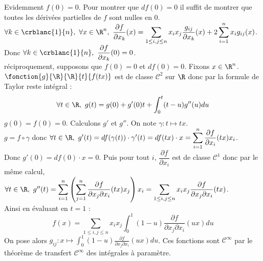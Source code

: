 \documentclass{book}
\begin{document}
\begin{enumerate}
		Evidemment $f(0)=0$. Pour montrer que $df(0)=0$ il suffit de montrer que toutes les dérivées partielles de $f$ sont nulles en $0$.\\
		$\forall k\in \crblanc{1}{n},\ \forall x\in \R^n,\ \dfrac{\partial f}{\partial x_k}(x)=\displaystyle\sum_{1\leq i,j\leq n}x_ix_j\frac{g_{ij}}{\partial x_k}(x)+2\sum_{i=1}^nx_ig_{ij}(x)$. Donc $\forall k\in \crblanc{1}{n},\ \dfrac{\partial f}{\partial x_k}(0)=0$.\\
		réciproquement, supposons que $f(0)=0$ et $df(0)=0$. Fixons $x\in \R^n$.\\
		$\fonction{g}{\R}{\R}{t}{f(tx)}$ est de classe $\mathcal C^2$ sur $\R$ donc par la formule de Taylor reste intégral :
		$$\forall t\in \R,\ g(t)=g(0)+g'(0)t+\int_0^t(t-u)g''(u)du$$
		$g(0)=f(0)=0$. Calculons $g'$ et $g''$. On note $\gamma:t\mapsto tx$.\\
		$g=f\circ \gamma$ donc $\forall t\in \R,\ g'(t)=df(\gamma(t))\cdot\gamma'(t)=df(tx)\cdot x=\displaystyle\sum_{i=1}^n\frac{\partial f}{\partial x_i}(tx)x_i$.\\
		Donc $g'(0)=df(0)\cdot x=0$. Puis pour tout $i$, $\dfrac{\partial f}{\partial x_i}$ est de classe $\mathcal C^1$ donc par le même calcul, $\forall t\in \R,\ g''(t)=\displaystyle\sum_{i=1}^n\left(\sum_{j=1}^n\frac{\partial f}{\partial x_j\partial x_i}(tx)x_j\right)x_i=\sum_{1\leq i,j\leq n}x_ix_j\frac{\partial f}{\partial x_j\partial x_i}(tx)$.\\
		Ainsi en évaluant en $t=1$ :
		$$f(x)=\sum_{1\leq i,j\leq n}x_ix_j\int_0^1(1-u)\frac{\partial f}{\partial x_j\partial x_i}(ux)du$$
		On pose alors $g_{ij} : x\mapsto \displaystyle\int_0^1(1-u)\frac{\partial f}{\partial x_j\partial x_i}(ux)du$. Ces fonctions sont $\mathcal C^\infty$ par le théorème de transfert $\mathcal C^\infty$ des intégrales à paramètre.
	\end{enumerate}
	
\end{document}
